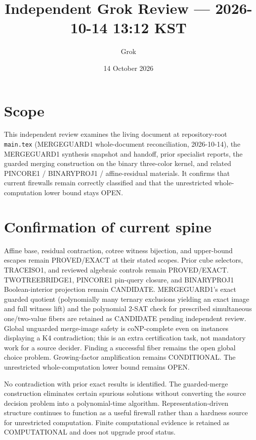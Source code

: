 \documentclass[11pt]{article}
\title{Independent Grok Review --- 2026-10-14 13:12 KST}
\author{Grok}
\date{14 October 2026}
\begin{document}
\maketitle

\begin{center}
\end{center}

\section{Scope}
This independent review examines the living document at repository-root \texttt{main.tex} (MERGEGUARD1 whole-document reconciliation, 2026-10-14), the MERGEGUARD1 synthesis snapshot and handoff, prior specialist reports, the guarded merging construction on the binary three-color kernel, and related PINCORE1 / BINARYPROJ1 / affine-residual materials. It confirms that current firewalls remain correctly classified and that the unrestricted whole-computation lower bound stays OPEN.

\section{Confirmation of current spine}
Affine base, residual contraction, cotree witness bijection, and upper-bound escapes remain PROVED/EXACT at their stated scopes. Prior cube selectors, TRACEISO1, and reviewed algebraic controls remain PROVED/EXACT. TWOTREEBRIDGE1, PINCORE1 pin-query closure, and BINARYPROJ1 Boolean-interior projection remain CANDIDATE. MERGEGUARD1's exact guarded quotient (polynomially many ternary exclusions yielding an exact image and full witness lift) and the polynomial 2-SAT check for prescribed simultaneous one/two-value fibers are retained as CANDIDATE pending independent review. Global unguarded merge-image safety is coNP-complete even on instances displaying a K4 contradiction; this is an extra certification task, not mandatory work for a source decider. Finding a successful fiber remains the open global choice problem. Growing-factor amplification remains CONDITIONAL. The unrestricted whole-computation lower bound remains OPEN.

No contradiction with prior exact results is identified. The guarded-merge construction eliminates certain spurious solutions without converting the source decision problem into a polynomial-time algorithm. Representation-driven structure continues to function as a useful firewall rather than a hardness source for unrestricted computation. Finite computational evidence is retained as COMPUTATIONAL and does not upgrade proof status.
\end{document}
